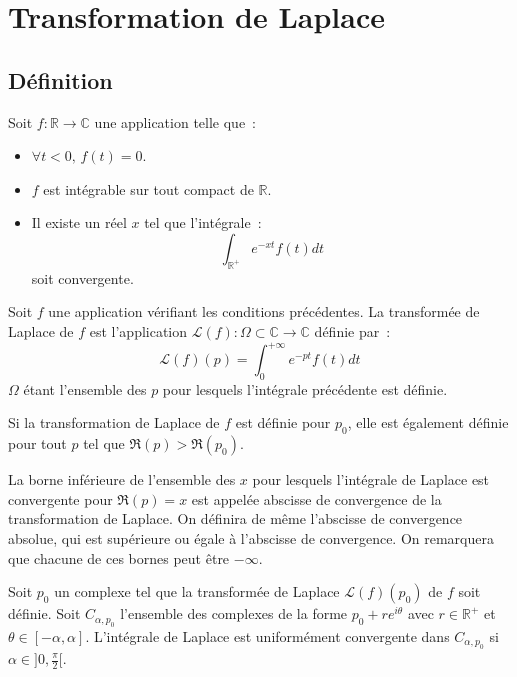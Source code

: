 \chapter{Transformation de Laplace}
\section{Définition}
Soit $f : \mathbb{R} \to \mathbb{C}$ une application telle que~:
\begin{itemize}
\item $\forall t < 0, \, f(t) = 0$.
\item $f$ est intégrable sur tout compact de $\mathbb{R}$.
\item Il existe un réel $x$ tel que l'intégrale~:
\[
\int_{\mathbb{R}^+}e^{-xt} f(t) dt
\]
soit convergente.
\end{itemize}
\begin{mandatory}
\begin{defn}
Soit $f$ une application vérifiant les conditions précédentes. La
transformée de Laplace de $f$ est l'application $\mathcal{L}(f) : \Omega \subset \mathbb{C} \to
\mathbb{C}$ définie par~:
\[
\mathcal{L}(f)(p) = \int_0^{+\infty}e^{-pt} f(t) dt
\]
$\Omega$ étant l'ensemble des $p$ pour lesquels l'intégrale précédente
est définie.
\end{defn}
\end{mandatory}
\begin{mandatory}
\begin{prop}
Si la transformation de Laplace de $f$ est définie pour $p_0$, elle
est également définie pour tout $p$ tel que $\Re(p) > \Re(p_0)$.
\end{prop} 
\end{mandatory}
La borne inférieure de l'ensemble des $x$ pour lesquels l'intégrale de
Laplace est convergente pour $\Re(p) = x$ est appelée abscisse de
convergence de la transformation de Laplace.
On définira de même l'abscisse de convergence absolue, qui est
supérieure ou égale à l'abscisse de convergence. On remarquera que
chacune de ces bornes peut être $-\infty$.
\begin{mandatory}
\begin{prop}
Soit $p_0$ un complexe tel que la transformée de Laplace $\mathcal{L}(f)(p_0)$ de
$f$ soit définie. Soit $C_{\alpha, p_0}$ l'ensemble des complexes de
la forme $p_0 + r e^{i \theta}$ avec $r \in \mathbb{R}^+$ et $\theta
\in [-\alpha, \alpha]$. L'intégrale de Laplace est uniformément
convergente dans $C_{\alpha, p_0}$ si $\alpha \in ]0, \frac{\pi}{2}[$.
\end{prop}
\end{mandatory}

